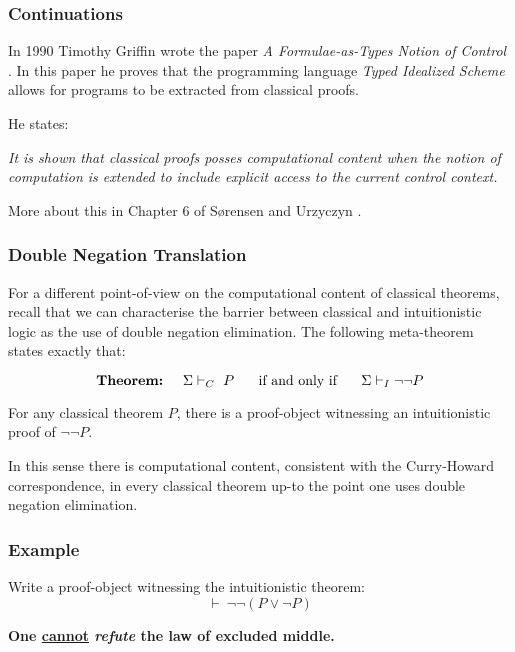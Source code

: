 \documentclass{beamer}
\theoremstyle{indentDefn} \newtheorem{defn}[]{Definition}
\begin{document}
\begin{frame}
  \frametitle{Continuations}


  In 1990 Timothy Griffin wrote the paper \emph{A Formulae-as-Types Notion of Control} \cite{griffin}. In this paper he proves that the programming language \emph{Typed Idealized Scheme} allows for programs to be extracted from classical proofs.

  \vspace{0.5cm}

  He states:

  \emph{It is shown that classical proofs posses computational content when the notion of computation is extended to include explicit access to the current control context.}

  More about this in Chapter 6 of S\o rensen and Urzyczyn \cite{LoCHI}.


\end{frame}

\begin{frame}
  \frametitle{Double Negation Translation}



  For a different point-of-view on the computational content of classical theorems, recall that we can characterise the barrier between classical and intuitionistic logic as the use of double negation elimination. The following meta-theorem states exactly that: 

  $$\text{{\bf Theorem:}} \hspace{0.5cm} \Sigma \vdash_{C} \ P \hspace{0.5cm} \text{ if and only if } \hspace{0.5cm} \Sigma \vdash_{I} \lnot\lnot P$$

  For any classical theorem $P$, there is a proof-object witnessing an intuitionistic proof of $\lnot \lnot P$. 

  \vspace{0.5cm}

  In this sense there is computational content, consistent with the Curry-Howard correspondence, in every classical theorem up-to the point one uses double negation elimination. 

\end{frame}

\begin{frame}
  \frametitle{Example}

  Write a proof-object witnessing the intuitionistic theorem: $$ \vdash \ \lnot \lnot (P \lor \lnot P)$$

  \vspace{5cm}
  {\bf One \underline{cannot} \emph{refute} the law of excluded middle.}
\end{frame}
\end{document}
